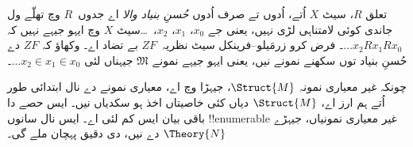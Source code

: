 \documentclass[../../../include/open-logic-section]{subfiles}
\begin{document}
\begin{prob}
تعلق $R$، سیٹ $X$ اُتے، اُدوں تے صرف اُدوں \emph{حُسنِ بنیاد والا} اے جدوں~$R$ وچ تھلّے ول جاندی کوئی لامتناہی لڑی نہیں، یعنی جے $x_0$، $x_1$، $x_2$،~\dots سیٹ $X$ وچ ایہو جیہے نہیں کہ $\dots x_2Rx_1Rx_0$۔ فرض کرو زرمَیلو--فرینکل سیٹ نظریہ~$ZF$ بے تضاد اے۔ وکھاؤ کہ $ZF$ دے حُسنِ بنیاد توں سکھنے نمونے نیں، یعنی ایہو جیہے نمونے $\mathfrak{M}$ جیہناں لئی $\dots x_2 \in x_1 \in x_0$۔
\end{prob}

چونکہ غیر معیاری نمونہ $\Struct{M}$، جیہڑا  وچ اے، معیاری نمونے دے نال ابتدائی طور اُتے ہم ارز اے، $\Struct{M}$ دیاں کئی خاصیتاں اخذ ہو سکدیاں نیں۔ ایس حصے دا باقی بیان ایس کم لئی اے۔ ایس نال سانوں !!{enumerable} غیر معیاری نمونیاں، جیہڑے $\Theory{N}$ دے نیں، دی دقیق پہچان ملے گی۔
\end{document}
